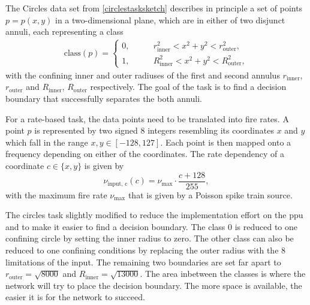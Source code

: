 The Circles data set from \cref{circlestasksketch} describes in principle a set of points $p = p(x,y)$ in a two-dimensional plane, which are in either of two disjunct annuli, each representing a class
\begin{align}
\text{class}(p) =
\begin{cases}
0 ,&\quad \quad r_{\text{inner}}^2 < x^2 + y^2 < r_{\text{outer}}^2, \\
1 ,&\quad \quad R_{\text{inner}}^2 < x^2 + y^2 < R_{\text{outer}}^2,
\end{cases}
\end{align}
with the confining inner and outer radiuses of the first and second annulus $r_{\text{inner}}$, $r_{\text{outer}}$ and  $R_{\text{inner}}$, $R_{\text{outer}}$ respectively. The goal of the task is to find a decision boundary that successfully separates the both annuli.

For a rate-based task, the data points need to be translated into fire rates. A point $p$ is represented by two signed \SI{8}{\bit} integers resembling its coordinates $x$ and $y$ which fall in the range $x, y \in [-128,127]$. Each point is then mapped onto a frequency depending on either of the coordinates. The rate dependency of a coordinate $c \in \{x,y\}$ is given by
\begin{equation}\label{inputfrequency}
\nu_{\text{input, c}}(c) = \nu_\text{max} \cdot \frac{c + 128}{255},
\end{equation}
with the maximum fire rate $\nu_\text{max}$ that is given by a Poisson spike train source. 



The circles task slightly modified to reduce the implementation effort on the \gls{ppu} and to make it easier to find a decision boundary. The class $0$ is reduced to one confining circle by setting the inner radius to zero. The other class can also be reduced to one confining conditions by replacing the outer radius with the \SI{8}{\bit} limitations of the input. The remaining two boundaries are set far apart to $r_{\text{outer}} = \sqrt{8000}$ and $R_{\text{inner}} = \sqrt{13000}$. The area inbetween the classes is where the network will try to place the decision boundary. The more space is available, the easier it is for the network to succeed.

